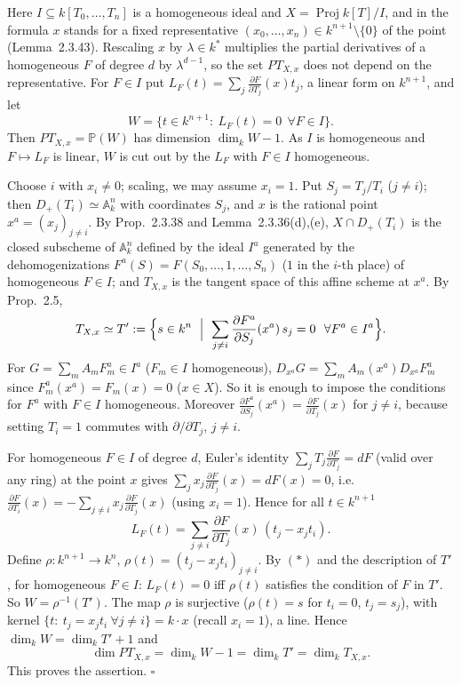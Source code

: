 \documentclass[11pt]{article}
\begin{document}
\pf
Here $I\subseteq k[T_0,\dots,T_n]$ is a homogeneous ideal and $X=\operatorname{Proj}k[T]/I$, and in the formula $x$ stands for a fixed representative $(x_0,\dots,x_n)\in k^{n+1}\setminus\{0\}$ of the point (Lemma~2.3.43). Rescaling $x$ by $\lambda\in k^*$ multiplies the partial derivatives of a homogeneous $F$ of degree $d$ by $\lambda^{d-1}$, so the set $PT_{X,x}$ does not depend on the representative. For $F\in I$ put $L_F(t)=\sum_j\frac{\partial F}{\partial T_j}(x)t_j$, a linear form on $k^{n+1}$, and let
\[ W=\{t\in k^{n+1}:\ L_F(t)=0\ \ \forall F\in I\}. \]
Then $PT_{X,x}=\mathbb P(W)$ has dimension $\dim_kW-1$. As $I$ is homogeneous and $F\mapsto L_F$ is linear, $W$ is cut out by the $L_F$ with $F\in I$ homogeneous.

Choose $i$ with $x_i\ne0$; scaling, we may assume $x_i=1$. Put $S_j=T_j/T_i$ ($j\ne i$); then $D_+(T_i)\simeq\mathbb A^n_k$ with coordinates $S_j$, and $x$ is the rational point $x^a=(x_j)_{j\ne i}$. By Prop.~2.3.38 and Lemma~2.3.36(d),(e), $X\cap D_+(T_i)$ is the closed subscheme of $\mathbb A^n_k$ defined by the ideal $I^a$ generated by the dehomogenizations $F^a(S)=F(S_0,\dots,1,\dots,S_n)$ ($1$ in the $i$-th place) of homogeneous $F\in I$; and $T_{X,x}$ is the tangent space of this affine scheme at $x^a$. By Prop.~2.5,
\[ T_{X,x}\simeq T':=\Bigl\{s\in k^n\ \Bigm|\ \sum_{j\ne i}\frac{\partial F^a}{\partial S_j}(x^a)\,s_j=0\ \ \forall F^a\in I^a\Bigr\}. \]
For $G=\sum_mA_mF_m^a\in I^a$ ($F_m\in I$ homogeneous), $D_{x^a}G=\sum_mA_m(x^a)D_{x^a}F^a_m$ since $F_m^a(x^a)=F_m(x)=0$ ($x\in X$). So it is enough to impose the conditions for $F^a$ with $F\in I$ homogeneous. Moreover $\frac{\partial F^a}{\partial S_j}(x^a)=\frac{\partial F}{\partial T_j}(x)$ for $j\ne i$, because setting $T_i=1$ commutes with $\partial/\partial T_j$, $j\ne i$.

For homogeneous $F\in I$ of degree $d$, Euler's identity $\sum_jT_j\frac{\partial F}{\partial T_j}=dF$ (valid over any ring) at the point $x$ gives $\sum_jx_j\frac{\partial F}{\partial T_j}(x)=dF(x)=0$, i.e.\ $\frac{\partial F}{\partial T_i}(x)=-\sum_{j\ne i}x_j\frac{\partial F}{\partial T_j}(x)$ (using $x_i=1$). Hence for all $t\in k^{n+1}$
\[ L_F(t)=\sum_{j\ne i}\frac{\partial F}{\partial T_j}(x)\,(t_j-x_jt_i). \tag{$*$} \]
Define $\rho:k^{n+1}\to k^n$, $\rho(t)=(t_j-x_jt_i)_{j\ne i}$. By $(*)$ and the description of $T'$, for homogeneous $F\in I$: $L_F(t)=0$ iff $\rho(t)$ satisfies the condition of $F$ in $T'$. So $W=\rho^{-1}(T')$. The map $\rho$ is surjective ($\rho(t)=s$ for $t_i=0$, $t_j=s_j$), with kernel $\{t:\ t_j=x_jt_i\ \forall j\ne i\}=k\cdot x$ (recall $x_i=1$), a line. Hence $\dim_kW=\dim_kT'+1$ and
\[ \dim PT_{X,x}=\dim_kW-1=\dim_kT'=\dim_kT_{X,x}. \]
This proves the assertion. \hfill$\square$
\end{document}
